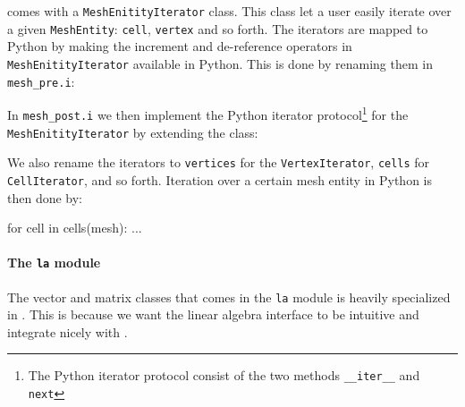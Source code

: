 \begin{code}
\dolfin comes with a \texttt{Mesh}\-\texttt{Enitity}\-\texttt{Iterator} class. This class let a user easily iterate over a given \texttt{MeshEntity}: \texttt{cell}, \texttt{vertex} and so forth. The iterators are mapped to Python by making the increment and de-reference operators in \texttt{MeshEnitityIterator} available in Python. This is done by renaming them in \texttt{mesh\_pre.i}:
\begin{code}
\end{code}
In \texttt{mesh\_post.i} we then implement the Python iterator protocol\footnote{The Python iterator protocol consist of the two methods \texttt{\_\_iter\_\_} and \texttt{next}} for the \texttt{Mesh}\-\texttt{Enitity}\-\texttt{Iterator} by extending the class:
We also rename the iterators to \texttt{vertices} for the \texttt{VertexIterator}, \texttt{cells} for \texttt{CellIterator}, and so forth. Iteration over a certain mesh entity in Python is then done by:
\begin{code}
for cell in cells(mesh):
    ...
\end{code}

\paragraph{The \texttt{la} module}
The vector and matrix classes that comes in the \texttt{la} module is heavily specialized in \pydolfin. This is because we want the linear algebra interface to be intuitive and integrate nicely with \numpy.\par


\end{code}
